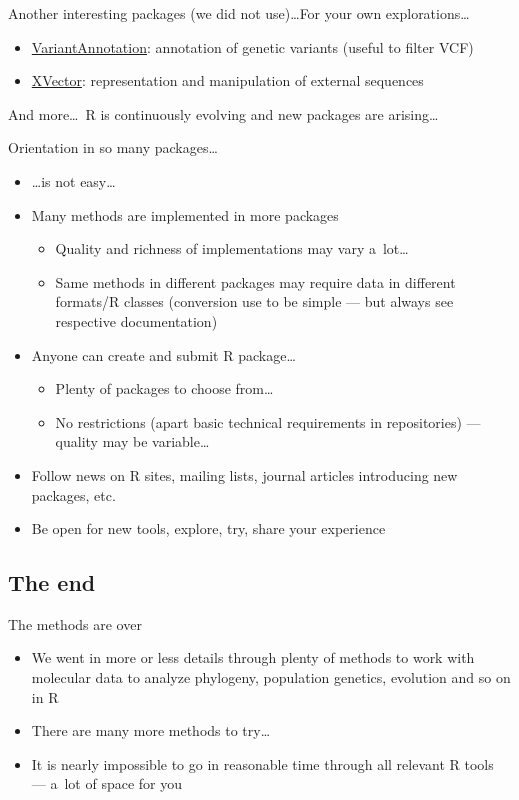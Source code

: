 \documentclass[compress, ucs, xelatex, 11pt, xcolor=svgnames,
	hyperref={
		bookmarks=true,
		unicode=true,
		colorlinks=true,
		pdftitle={Molecular data in R},
		plainpages=false,
		pdfauthor={Vojtech Zeisek},
		pdfsubject={Course about phylogeny and evolution in R},
		pdfcreator={XeLaTeX},
		pdfkeywords={R, evolution, phylogeny, molecular data},
		linkcolor=Tomato,
		anchorcolor=SaddleBrown,
		citecolor=Goldenrod,
		filecolor=DarkMagenta,
		menucolor=Sienna,
		urlcolor=DarkTurquoise,
		pdftex},
	url={hyphens, lowtilde} %
	]{beamer}
\begin{document}
\begin{frame}[allowframebreaks]{Another interesting packages (we did not use)\ldots}{For your own explorations\ldots}
\begin{itemize}
		\item \href{https://bioconductor.org/packages/VariantAnnotation/}{VariantAnnotation}: annotation of genetic variants (useful to filter VCF)
		\item \href{https://bioconductor.org/packages/release/bioc/html/XVector.html}{XVector}: representation and manipulation of external sequences
	\end{itemize}
	And more\ldots~R is continuously evolving and new packages are arising\ldots
\end{frame}

\begin{frame}{Orientation in so many packages\ldots}
	\begin{itemize}
		\item \ldots is not easy\ldots
		\item Many methods are implemented in more packages
		\begin{itemize}
			\item Quality and richness of implementations may vary a~lot\ldots
			\item Same methods in different packages may require data in different formats/R classes (conversion use to be simple --- but always see respective documentation)
		\end{itemize}
		\item Anyone can create and submit R package\ldots
		\begin{itemize}
			\item Plenty of packages to choose from\ldots
			\item No restrictions (apart basic technical requirements in repositories) --- quality may be variable\ldots
		\end{itemize}
		\item Follow news on R sites, mailing lists, journal articles introducing new packages, etc.
		\item Be open for new tools, explore, try, share your experience
	\end{itemize}
\end{frame}

\subsection{The end}

\begin{frame}{The methods are over}
	\begin{itemize}
		\item We went in more or less details through plenty of methods to work with molecular data to analyze phylogeny, population genetics, evolution and so on in R
		\item There are many more methods to try\ldots
		\item It is nearly impossible to go in reasonable time through all relevant R tools --- a~lot of space for you
	\end{itemize}
\end{frame}
\end{document}

